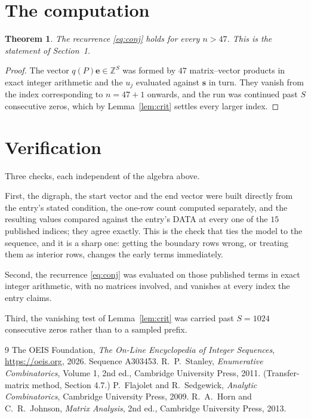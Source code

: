 \documentclass[11pt,a4paper]{article}
\theoremstyle{plain}
\newtheorem{theorem}{Theorem}
\theoremstyle{definition}
\begin{document}
\section{The computation}

\begin{theorem}
The recurrence \eqref{eq:conj} holds for every $n>47$. This is the statement of
Section~1.
\end{theorem}

\begin{proof}
The vector $q(P)\mathbf{e}\in\mathbb{Z}^{S}$ was formed by $47$ matrix--vector
products in exact integer arithmetic and the $u_j$ evaluated against $\mathbf{s}$ in turn.
They vanish from the index corresponding to $n=47+1$ onwards, and the run was continued
past $S$ consecutive zeros, which by Lemma~\ref{lem:crit} settles every larger index.
\end{proof}

\section{Verification}

Three checks, each independent of the algebra above.

First, the digraph, the start vector and the end vector were built directly from the
entry's stated condition, the one-row count computed separately, and the resulting values
compared against the entry's DATA at every one of the $15$ published indices; they
agree exactly. This is the check that ties the model to the sequence, and it is a sharp one:
getting the boundary rows wrong, or treating them as interior rows, changes the early terms
immediately.

Second, the recurrence \eqref{eq:conj} was evaluated on those published terms in exact
integer arithmetic, with no matrices involved, and vanishes at every index the entry claims.

Third, the vanishing test of Lemma~\ref{lem:crit} was carried past $S=1024$ consecutive
zeros rather than to a sampled prefix.

\begin{thebibliography}{9}
 The OEIS Foundation, \emph{The On-Line Encyclopedia of Integer
Sequences}, \url{https://oeis.org}, 2026. Sequence A303453.
 R.~P.~Stanley, \emph{Enumerative Combinatorics}, Volume 1, 2nd ed.,
Cambridge University Press, 2011. (Transfer-matrix method, Section 4.7.)
 P.~Flajolet and R.~Sedgewick, \emph{Analytic Combinatorics}, Cambridge
University Press, 2009.
 R.~A.~Horn and C.~R.~Johnson, \emph{Matrix Analysis}, 2nd ed., Cambridge
University Press, 2013.
\end{thebibliography}
\end{document}
